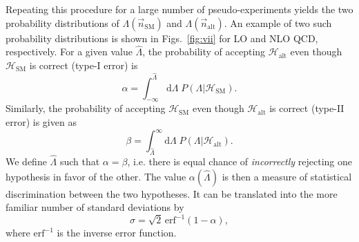 \documentclass[preprint]{JHEP3}
\newcommand{\SM}{\mathrm{SM}}
\newcommand{\alt}{\mathrm{alt}}
\def\hLambda {\hat{\Lambda}}
\def\erf{\mathrm{erf}}
\def\HSM{\mathcal{H}_{\mathrm{SM}}}
\def\Halt{\mathcal{H}_{\mathrm{alt}}}
\newcommand{\ee}{\end{eqnarray}}
\begin{document}
Repeating this procedure for a large number of pseudo-experiments yields the two probability distributions of $\Lambda(\vec{n}_\mathrm{SM})$ and $\Lambda(\vec{n}_\mathrm{alt})$. 
An example of two such probability distributions is shown in Figs.~\ref{fig:vii} for LO and NLO QCD, respectively. 
For a given value $\hat{\Lambda}$, the probability of accepting $\mathcal{H}_{\alt}$ even though $\mathcal{H}_{\SM}$ is correct (type-I error) is
\begin{equation}
    \alpha = \int^{\hLambda}_{-\infty} \mathrm{d}\Lambda \; P(\Lambda | {\HSM}).
\end{equation}
Similarly, the probability of accepting $\mathcal{H}_{\SM}$ even though $\mathcal{H}_{\alt}$ is correct (type-II error) is given as 
\begin{equation}
    \beta = \int_{\hLambda}^{\infty} \mathrm{d}\Lambda \; P(\Lambda|\Halt).
\end{equation}
We define $\hLambda$ such that $\alpha=\beta$, i.e. there is equal chance of {\it incorrectly} rejecting one hypothesis in favor of the other. 
The value $\alpha(\hLambda)$ is then a measure of statistical discrimination between the two hypotheses. 
It can be translated into the more familiar number of standard deviations by 
\begin{equation}
\sigma = \sqrt{2} \, \erf^{-1}(1-\alpha),
\end{equation}
where $\erf^{-1}$ is the inverse error function. 
\end{document}
